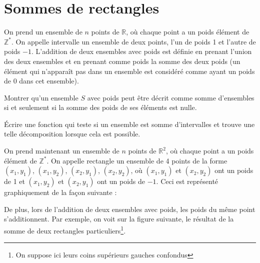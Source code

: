 \renewcommand{\SourceFile}{6-geometrie-et-images/src/6-3.ml}

\section{Sommes de rectangles}

On prend un ensemble de $n$ points de $\mathbb{R}$, où chaque point a un poids élément de $\mathbb{Z}^*$. On appelle intervalle un ensemble de deux points, l'un de poids 1 et l'autre de poids $-1$. L'addition de deux ensembles avec poids est définie en prenant l'union des deux ensembles et en prenant comme poids la somme des deux poids (un élément qui n'apparaît pas dans un ensemble est considéré comme ayant un poids de 0 dans cet ensemble).

\Q
Montrer qu'un ensemble $S$ avec poids peut être décrit comme somme d'ensembles si et seulement si la somme des poids de ses éléments est nulle.

\Q
Écrire une fonction qui teste si un ensemble est somme d'intervalles et trouve une telle décomposition lorsque cela est possible.
\medskip

On prend maintenant un ensemble de $n$ points de $\mathbb{R}^2$, où chaque point a un poids élément de $\mathbb{Z}^*$. On appelle rectangle un ensemble de 4 points de la forme $(x_1,y_1)$, $(x_1,y_2)$, $(x_2,y_1)$, $(x_2,y_2)$, où $(x_1,y_1)$ et $(x_2,y_2)$ ont un poids de 1 et $(x_1,y_2)$ et $(x_2,y_1)$ ont un poids de $-1$. Ceci est représenté graphiquement de la façon suivante :

\begin{center}
\end{center}

De plus, lors de l'addition de deux ensembles avec poids, les poids du même point s'additionnent. Par exemple, on voit sur la figure suivante, le résultat de la somme de deux rectangles particuliers\footnote{On suppose ici leurs coins supérieurs gauches confondus}.

